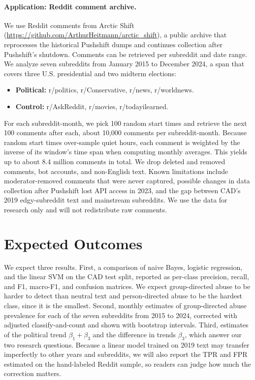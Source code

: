 \documentclass{article}
\begin{document}
\paragraph{Application: Reddit comment archive.} We use Reddit comments from Arctic Shift (\url{https://github.com/ArthurHeitmann/arctic_shift}), a public archive that reprocesses the historical Pushshift dumps \citep{baumgartner2020} and continues collection after Pushshift's shutdown.
Comments can be retrieved per subreddit and date range.
We analyze seven subreddits from January 2015 to December 2024, a span that covers three U.S. presidential and two midterm elections:
\begin{itemize}
  \item \textbf{Political:} r/politics, r/Conservative, r/news, r/worldnews.
  \item \textbf{Control:} r/AskReddit, r/movies, r/todayilearned.
\end{itemize}
For each subreddit-month, we pick 100 random start times and retrieve the next 100 comments after each, about 10,000 comments per subreddit-month.
Because random start times over-sample quiet hours, each comment is weighted by the inverse of its window's time span when computing monthly averages.
This yields up to about 8.4 million comments in total.
We drop deleted and removed comments, bot accounts, and non-English text.
Known limitations include moderator-removed comments that were never captured, possible changes in data collection after Pushshift lost API access in 2023, and the gap between CAD's 2019 edgy-subreddit text and mainstream subreddits.
We use the data for research only and will not redistribute raw comments.

\section{Expected Outcomes}

We expect three results.
First, a comparison of naive Bayes, logistic regression, and the linear SVM on the CAD test split, reported as per-class precision, recall, and F1, macro-F1, and confusion matrices.
We expect group-directed abuse to be harder to detect than neutral text and person-directed abuse to be the hardest class, since it is the smallest.
Second, monthly estimates of group-directed abuse prevalence for each of the seven subreddits from 2015 to 2024, corrected with adjusted classify-and-count and shown with bootstrap intervals.
Third, estimates of the political trend $\beta_1 + \beta_3$ and the difference in trends $\beta_3$, which answer our two research questions.
Because a linear model trained on 2019 text may transfer imperfectly to other years and subreddits, we will also report the TPR and FPR estimated on the hand-labeled Reddit sample, so readers can judge how much the correction matters.
\end{document}
